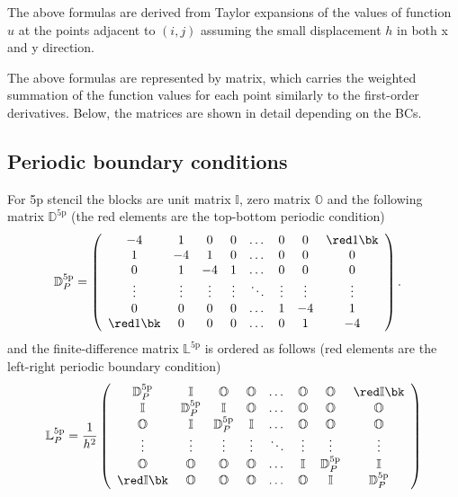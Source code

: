 The above formulas are derived from Taylor expansions of the values of function $u$ at the points adjacent to $(i,j)$ assuming the small displacement $h$ in both x and y direction.

The above formulas are represented by matrix, which carries the weighted summation of the function values for each point similarly to the first-order derivatives. Below, the matrices are shown in detail depending on the BCs. 

\subsection*{Periodic boundary conditions}
For 5p stencil the blocks are unit matrix $\mathbb{I}$, zero matrix $\mathbb{O}$ and the following matrix $\mathbb{D}^{\mathrm{5p}}$ (the red elements are the top-bottom periodic condition) 
\begin{equation}
	\begin{split}
		\mathbb{D}^{\mathrm{5p}}_P &= \left(\begin{array}{ccccccccc}
			-4 & 1 & 0&0& \dots&0&0 &\red 1\bk\\
			1&-4&1&0&\dots&0&0& 0\\
			0&1&-4&1 &\dots&0&0&0\\
			\vdots&\vdots&\vdots&\vdots&\ddots &\vdots&\vdots&\vdots\\
			0&0&0&0&\dots &1&-4&1 \\
			\red 1\bk&0&0&0&\dots &0&1&-4
		\end{array}\right).
	\end{split}
\end{equation}
and the finite-difference matrix $\mathbb{L}^{\mathrm{5p}}$ is ordered as follows (red elements are the left-right periodic boundary condition)
\begin{equation}
	\mathbb{L}^{\mathrm{5p}}_P = \frac{1}{h^2}\left(\begin{array}{cccccccccc}
		\mathbb{D}^{\mathrm{5p}}_P & \mathbb{I} & \mathbb{O}&\mathbb{O}& \dots&\mathbb{O}&\mathbb{O} &\red \mathbb{I}\bk\\
		\mathbb{I}&\mathbb{D}^{\mathrm{5p}}_P & \mathbb{I} & \mathbb{O}& \dots&\mathbb{O}&\mathbb{O}&\mathbb{O}\\
		\mathbb{O}&\mathbb{I}&\mathbb{D}^{\mathrm{5p}}_P & \mathbb{I} &  \dots&\mathbb{O}&\mathbb{O}&\mathbb{O}\\
		\vdots&\vdots&\vdots&\vdots&\ddots &\vdots&\vdots&\vdots\\
		\mathbb{O}&\mathbb{O}&\mathbb{O}&\mathbb{O}&\dots &\mathbb{I}&\mathbb{D}^{\mathrm{5p}}_P & \mathbb{I} \\
		\red \mathbb{I}\bk&\mathbb{O}&\mathbb{O}&\mathbb{O}&\dots &\mathbb{O}&\mathbb{I}&\mathbb{D}^{\mathrm{5p}}_P
	\end{array}\right)
\end{equation}


